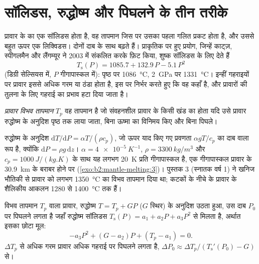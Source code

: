 \section{सॉलिडस, रुद्धोष्म और पिघलने के तीन तरीके}\label{sec:b2:mantle-melting:solidus}

प्रावार के  का एक सॉलिडस होता है, वह तापमान जिस पर उसका पहला गलित प्रकट होता है,
और उससे बहुत ऊपर एक लिक्विडस। दोनों दाब के साथ बढ़ते हैं। प्राकृतिक
 पर हुए प्रयोग, जिन्हें काट्ज़, स्पीगलमैन और लैंगम्यूर ने 2003 में संकलित करके फ़िट किया,
शुष्क सॉलिडस के लिए देते हैं
\[
  T_{\mathrm{s}}(P) = 1085.7 + 132.9\,P - 5.1\,P^2
\]
(डिग्री सेल्सियस में, $P$ गीगापास्कल में): पृष्ठ पर \qty{1086}{\celsius},
\qty{2}{GPa} पर \qty{1331}{\celsius}। इन्हीं गहराइयों पर प्रावार इससे अधिक गरम या
ठंडा होता है, इस पर निर्भर करते हुए कि वह कहाँ है, और प्रावारों की तुलना के लिए
गहराई का प्रभाव हटा दिया जाता है।

\begin{definition}[प्रावार विभव तापमान]\label{def:b2:mantle-melting:tp}
\emph{प्रावार विभव तापमान} $T_p$
वह तापमान है जो संवहनशील प्रावार के किसी खंड का होता यदि उसे
प्रावार रुद्धोष्म के अनुदिश पृष्ठ तक लाया जाता, बिना ऊष्मा का विनिमय किए और
बिना पिघले।
\end{definition}

रुद्धोष्म के अनुदिश $\mathrm dT/\mathrm dP = \alpha T/(\rho c_p)$, जो ऊपर याद किए गए
प्रवणता $\alpha gT/c_p$ का दाब वाला रूप है, क्योंकि $\mathrm dP = \rho
g\,\mathrm dz$। $\alpha = \qty{4e-5}{K^{-1}}$, $\rho = \qty{3300}{kg/m^3}$
और $c_p = \qty{1000}{J/(kg.K)}$ के साथ यह लगभग \qty{20}{K} प्रति गीगापास्कल है,
एक गीगापास्कल प्रावार के \qty{30.9}{km} के बराबर होने पर (\cref{exo:b2:mantle-melting:3})। पुस्तक 3 (स्नातक वर्ष 1) ने
खनिज भौतिकी से प्रावार को लगभग \qty{1350}{\celsius} का विभव तापमान दिया था;
कटकों के नीचे के प्रावार के शैलिकीय आकलन 1280 से
\qty{1400}{\celsius} तक हैं।

\begin{proposition}[विसंपीडन गलन का आरंभ]\label{prop:b2:mantle-melting:onset}
विभव तापमान $T_p$ वाला प्रावार, रुद्धोष्म $T = T_p + GP$ ($G$
स्थिर) के अनुदिश उठता हुआ, उस दाब $P_0$ पर पिघलने लगता है जहाँ रुद्धोष्म
सॉलिडस $T_{\mathrm s}(P) = a_1 + a_2P + a_3P^2$ से मिलता है, अर्थात इसका छोटा मूल:
\[
  -a_3P^2 + (G - a_2)P + (T_p - a_1) = 0 .
\]
$\Delta T_p$ से अधिक गरम प्रावार अधिक गहराई पर पिघलने लगता है, $\Delta P_0 \approx
\Delta T_p/(T_{\mathrm s}'(P_0) - G)$ से।
\end{proposition}

